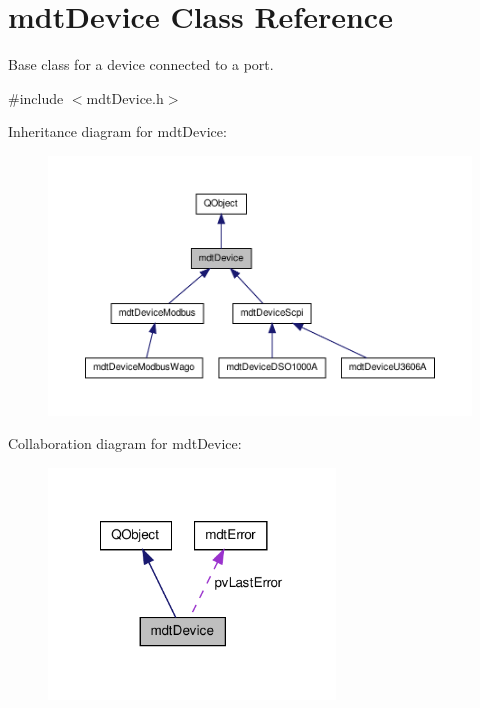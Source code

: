\hypertarget{classmdt_device}{\section{mdt\-Device Class Reference}
\label{classmdt_device}
}


Base class for a device connected to a port.  




{\ttfamily \#include $<$mdt\-Device.\-h$>$}



Inheritance diagram for mdt\-Device\-:\nopagebreak
\begin{figure}[H]
\begin{center}
\leavevmode
\includegraphics[width=350pt]{classmdt_device__inherit__graph}
\end{center}
\end{figure}


Collaboration diagram for mdt\-Device\-:\nopagebreak
\begin{figure}[H]
\begin{center}
\leavevmode
\includegraphics[width=216pt]{classmdt_device__coll__graph}
\end{center}
\end{figure}
